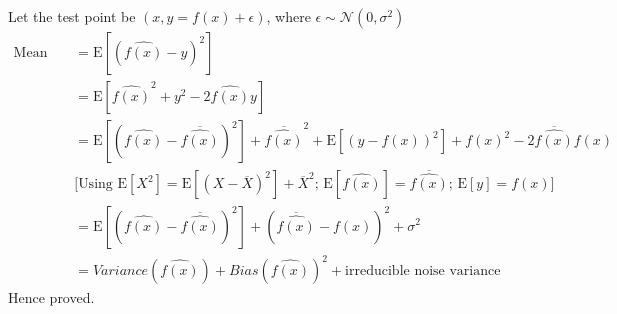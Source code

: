 \documentclass[12pt, fleqn]{article}
\begin{document}
\subsubsection{}
Let the test point be $(x, y = f(x) + \epsilon)$, where $\epsilon \sim \mathcal{N}(0, \sigma^2)$
\begin{equation*}
  \begin{aligned}
    \text{Mean Squared Error} & = \text{E} [ (\hat{f(x)} - y)^2 ]                                                                                                                                      \\
                              & = \text{E} [ \hat{f(x)}^2 + y^2 - 2 \hat{f(x)} y ]                                                                                                                     \\
                              & = \text{E} [(\hat{f(x)} - \overline{\hat{f(x)}})^2] + \overline{\hat{f(x)}}^2 + \text{E} [(y - f(x))^2] + f(x)^2 - 2 \overline{\hat{f(x)}} f(x)                        \\
                              & \bigg[ \text{Using $\text{E} [X^2] = \text{E} [(X - \overline{X})^2] + \overline{X}^2$; $\text{E} [\hat{f(x)}] = \overline{\hat{f(x)}}$; $\text{E} [y] = f(x)$} \bigg] \\
                              & = \text{E} [(\hat{f(x)} - \overline{\hat{f(x)}})^2] + (\overline{\hat{f(x)}} - f(x))^2 + \sigma^2                                                                      \\
                              & = Variance(\hat{f(x)}) + Bias(\hat{f(x)})^2 + \text{irreducible noise variance}
  \end{aligned}
\end{equation*}
Hence proved.
\end{document}
